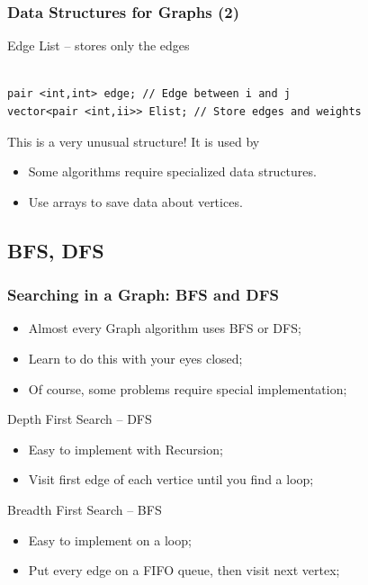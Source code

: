 \documentclass{beamer}
\begin{document}
\begin{frame}[fragile]
  \frametitle{Data Structures for Graphs (2)}
  {\smaller
    \begin{block}{Edge List -- stores only the edges}
\begin{verbatim}

pair <int,int> edge; // Edge between i and j
vector<pair <int,ii>> Elist; // Store edges and weights
\end{verbatim}

\bigskip

This is a very unusual structure! It is used by 

    \end{block}

    \vfill 

    \begin{itemize}
    \item Some algorithms require specialized data structures.
    \item Use arrays to save data about vertices.
    \end{itemize}
    
  }
\end{frame}


\subsection{BFS, DFS}
\begin{frame}
  \frametitle{Searching in a Graph: BFS and DFS}   
  {\small

    \begin{itemize}
    \item Almost every Graph algorithm uses BFS or DFS;
    \item Learn to do this with your eyes closed;
    \item Of course, some problems require special implementation;
    \end{itemize}

  \begin{block}{Depth First Search -- DFS}
    \begin{itemize}
    \item Easy to implement with Recursion;
    \item Visit first edge of each vertice until you find a loop;
    \end{itemize}
  \end{block}

  \begin{block}{Breadth First Search -- BFS}
    \begin{itemize}
    \item Easy to implement on a loop;
    \item Put every edge on a FIFO queue, then visit next vertex;
    \end{itemize}
  \end{block}

  }
\end{frame}
\end{document}
